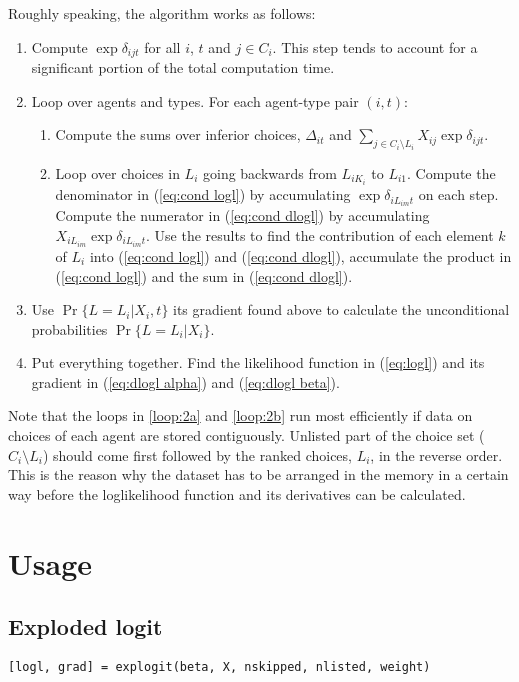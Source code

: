 \documentclass[12pt]{article}
\begin{document}
Roughly speaking, the algorithm works as follows:
\begin{enumerate}
	\item{}Compute $\exp\delta_{ijt}$ for all $i$, $t$ and $j\in C_i$. This step tends to account for a significant portion of the total computation time.
	\item{}Loop over agents and types. For each agent-type pair $(i,t)$:
	\begin{enumerate}
		\item\label{loop:2a} Compute the sums over inferior choices, $\Delta_{it}$ and  $\sum_{j\in{C_i\setminus{L_i}}}X_{ij}\exp{\delta_{ijt}}$.
		\item\label{loop:2b} Loop over choices in $L_i$ going backwards from $L_{iK_i}$ to $L_{i1}$. Compute the denominator in (\ref{eq:cond logl}) by accumulating $\exp\delta_{iL_{im}t}$ on each step. Compute the numerator in (\ref{eq:cond dlogl}) by accumulating $X_{iL_{im}}\exp\delta_{iL_{im}t}$. Use the results to find the contribution of each element $k$ of $L_i$ into (\ref{eq:cond logl}) and (\ref{eq:cond dlogl}), accumulate the product in (\ref{eq:cond logl}) and the sum in (\ref{eq:cond dlogl}).
		 
	\end{enumerate}
	\item{}Use $\Pr\{L=L_i|X_i,t\}$ its gradient found above to calculate the unconditional probabilities $\Pr\{L=L_i|X_i\}$.
	\item Put everything together. Find the likelihood function in (\ref{eq:logl}) and its gradient in (\ref{eq:dlogl alpha}) and (\ref{eq:dlogl beta}).
\end{enumerate}
Note that the loops in \ref{loop:2a} and \ref{loop:2b} run most efficiently if data on choices of each agent are stored contiguously. Unlisted part of the choice set ($C_i\setminus L_i$) should come first followed by the ranked choices, $L_i$, in the reverse order. This is the reason why the dataset has to be arranged in the memory in a certain way before the loglikelihood function and its derivatives can be calculated.


\section{Usage}

\subsection{Exploded logit}
\texttt{[logl, grad] = explogit(beta, X, nskipped, nlisted, weight)}
\end{document}
